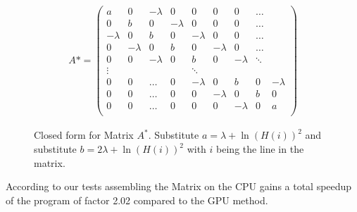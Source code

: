 \begin{figure}[htb]
  \centering
  {\small
  \begin{align*}
    A*= \begin{pmatrix}
      a & 0 & -\lambda & 0 & 0 & 0 & 0 & \dots\\
      0 & b & 0 & -\lambda & 0 & 0 & 0 & \dots\\
      -\lambda & 0 & b & 0 & -\lambda & 0 & 0 & \dots\\
      0 & -\lambda & 0 & b & 0 & -\lambda & 0 & \dots\\
      0 & 0 & -\lambda & 0 & b & 0 & -\lambda & \ddots\\
      \vdots& &  &  &\ddots  \\
      0 & 0 & \dots & 0 & -\lambda & 0 & b & 0 & -\lambda\\
      0 & 0 & \dots & 0 & 0 &-\lambda & 0 & b & 0\\
      0 & 0 & \dots & 0 & 0 & 0 &-\lambda & 0 & a \\
    \end{pmatrix}
  \end{align*}
}
  \caption{Closed form for Matrix $A^*$. Substitute $a = \lambda +
  \ln(H(i))^2$ and substitute $b = 2\lambda + \ln(H(i))^2$ with $i$ being the line
in the matrix.}
  \label{fig:matrix-mult}
\end{figure}

According to our tests assembling the Matrix on the CPU gains a total speedup
of the program of factor 2.02 compared to the GPU method.
